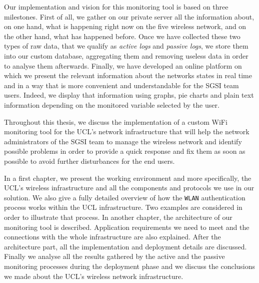 Our implementation and vision for this monitoring tool is based on three milestones. First of all, we gather on our private server all the information about, on one hand, what is happening right now on the five wireless network, and on the other hand, what has happened before. Once we have collected these two types of raw data, that we qualify as \textit{active logs} and \textit{passive logs}, we store them into our custom database, aggregating them and removing useless data in order to analyse them afterwards. Finally, we have developed an online platform on which we present the relevant information about the networks states in real time and in a way that is more convenient and understandable for the SGSI team users. Indeed, we display that information using graphs, pie charts and plain text information depending on the monitored variable selected by the user.

Throughout this thesis, we discuss the implementation of a custom WiFi monitoring tool for the UCL's network infrastructure that will help the network administrators of the SGSI team to manage the wireless network and identify possible problems in order to provide a quick response and fix them as soon as possible to avoid further disturbances for the end users. 


In a first chapter, we present the working environment and more specifically, the UCL's wireless infrastructure and all the components and protocols we use in our solution. We also give a fully detailed overview of how the \texttt{WLAN} authentication process works within the UCL infrastructure. Two examples are considered in order to illustrate that process. In another chapter, the architecture of our monitoring tool is described. Application requirements we need to meet and the connections with the whole infrastructure are also explained. After the architecture part, all the implementation and deployment details are discussed. Finally we analyse all the results gathered by the active and the passive monitoring processes during the deployment phase and we discuss the conclusions we made about the UCL's wireless network infrastructure.





